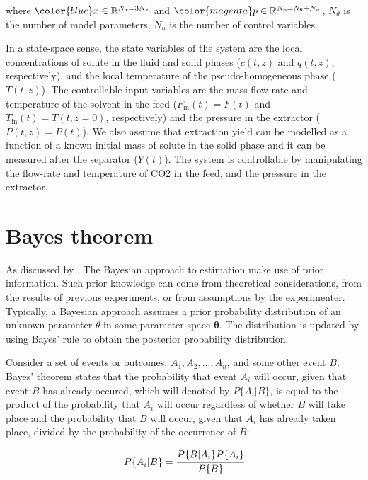 \documentclass[a4paper,fleqn]{cas-dc}
\begin{document}
where ${\color{blue}x} \in \mathbb{R}^{N_x = 3N_z} $ and ${\color{magenta}p} \in \mathbb{R}^{N_p =  N_{\theta} + N_u } $, $N_{\theta}$ is the number of model parameters, $N_{u}$ is the number of control variables.

{\color{blue} In a state-space sense, the state variables of the system are the local concentrations of solute in the fluid and solid phases ($c(t,z)$ and $q(t,z)$, respectively), and the local temperature of the pseudo-homogeneous phase ($T(t,z)$). The controllable input variables are the mass flow-rate and temperature of the solvent in the feed ($F_\text{in}(t) = F(t)$ and $T_\text{in}(t) = T(t,z=0)$, respectively) and the pressure in the extractor ($P(t,z) = P(t)$). {\color{red}We also assume that extraction yield can be modelled as a function of a known initial mass of solute in the solid phase and it can be measured after the separator ($Y(t)$).} The system is controllable by manipulating the flow-rate and temperature of CO2 in the feed, and the pressure in the extractor. }

\newpage
\section{Bayes theorem} \label{CH: Bayes}

As discussed by \citet{Himmelblau1970}, The Bayesian approach to estimation make use of prior information. Such prior knowledge can come from theoretical considerations, from the results of previous experiments, or from assumptions by the experimenter. Typically, a Bayesian approach assumes a prior probability distribution of an unknown parameter $\theta$ in some parameter space $\boldsymbol{\theta}$. The distribution is updated by using Bayes' rule to obtain the posterior probability distribution. 

Consider a set of events or outcomes, $A_1,A_2,...,A_n$, and some other event $B$. Bayes' theorem states that the probability that event $A_i$ will occur, given that event $B$ has already occured, which will denoted by $P\{A_i|B\}$, is equal to the product of the probability that $A_i$ will occur regardless of whether $B$ will take place and the probability that $B$ will occur, given that $A_i$  has already taken place, divided by the probability of the occurrence of $B$:

\begin{equation}
	P\{A_i|B\} = \cfrac{P\{B|A_i\}P\{A_i\}}{P\{B\}}
\end{equation}
\end{document}
